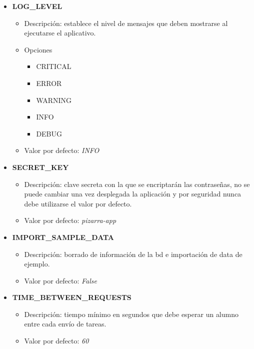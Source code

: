 \documentclass[11pt,spanish,listoffigures,listoftables]{tfgetsinf}
\begin{document}
\begin{itemize}
	\item \textbf{LOG\_LEVEL}
	\begin{itemize}
		\item Descripción: establece el nivel de mensajes que deben mostrarse al ejecutarse el aplicativo.
		\item Opciones
		\begin{itemize}
			\item CRITICAL
			\item ERROR
			\item WARNING
			\item INFO
			\item DEBUG
		\end{itemize}
		\item Valor por defecto: \textit{INFO}
	\end{itemize}
\end{itemize}

\begin{itemize}
	\item \textbf{SECRET\_KEY}
	\begin{itemize}
		\item Descripción: clave secreta con la que se encriptarán las contraseñas, no se puede cambiar una vez desplegada la aplicación y por seguridad nunca debe utilizarse el valor por defecto.
		\item Valor por defecto: \textit{pizarra-app}
	\end{itemize}
\end{itemize}

\begin{itemize}
	\item \textbf{IMPORT\_SAMPLE\_DATA}
	\begin{itemize}
		\item Descripción: borrado de información de la \acrshort{bd} e importación de data de ejemplo.
		\item Valor por defecto: \textit{False}
	\end{itemize}
\end{itemize}

\begin{itemize}
	\item \textbf{TIME\_BETWEEN\_REQUESTS}
	\begin{itemize}
		\item Descripción: tiempo mínimo en segundos que debe esperar un \gls{alumno} entre cada envío de \Gls{tarea}s.
		\item Valor por defecto: \textit{60}
	\end{itemize}
\end{itemize}
\end{document}
